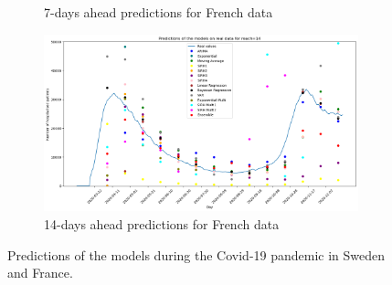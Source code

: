 \begin{figure}[h!]
\begin{subfigure}[b]{0.5\textwidth}
      \caption{7-days ahead predictions for French data}
      \label{fig:sousfig1F}
    \end{subfigure}
    \hfill
    \begin{subfigure}[b]{0.5\textwidth}
      \centering
      \includegraphics[width=\textwidth]{figures/real_data_France_14.png}  
      \caption{14-days ahead predictions for French data}
      \label{fig:sousfig2F}
    \end{subfigure}
  \caption{Predictions of the models during the Covid-19 pandemic in Sweden and France.}
  \label{fig:real_data}
\end{figure}